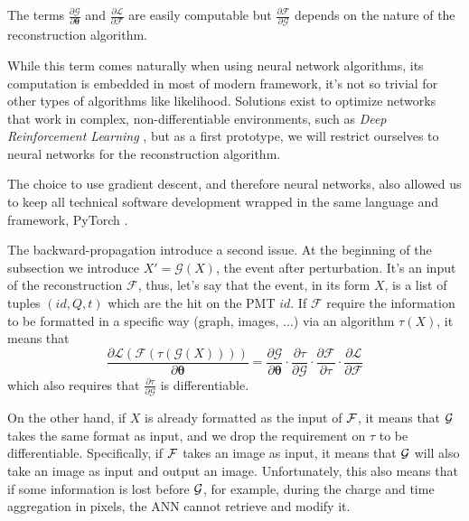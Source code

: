 \documentclass[../main.tex]{subfiles}
\begin{document}
The terms $\frac{\partial \mathcal{G}}{\partial \bm{\theta}}$ and $\frac{\partial \mathcal{L}}{\partial \mathcal{F}}$ are easily computable but $\frac{\partial \mathcal{F}}{\partial \mathcal{G}}$ depends on the nature of the reconstruction algorithm.


While this term comes naturally when using neural network algorithms, its computation is embedded in most of modern framework, it's not so trivial for other types of algorithms like likelihood. Solutions exist to optimize networks that work in complex, non-differentiable environments, such as \textit{Deep Reinforcement Learning} \cite{kiran_deep_2021, vinyals_grandmaster_2019}, but as a first prototype, we will restrict ourselves to neural networks for the reconstruction algorithm.

The choice to use gradient descent, and therefore neural networks, also allowed us to keep all technical software development wrapped in the same language and framework, PyTorch \cite{ansel_pytorch_2024}.

The backward-propagation introduce a second issue. At the beginning of the subsection we introduce $X' = \mathcal{G}(X)$, the event after perturbation. It's an input of the reconstruction $\mathcal{F}$, thus, let's say that the event, in its form $X$, is a list of tuples $(id, Q, t)$ which are the hit on the PMT $id$. If $\mathcal{F}$ require the information to be formatted in a specific way (graph, images, ...) via an algorithm $\tau(X)$, it means that
\begin{equation}
  \frac{\partial \mathcal{L}(\mathcal{F}(\tau(\mathcal{G}(X))))}{\partial \bm{\theta}} = \frac{\partial \mathcal{G}}{\partial \bm{\theta}} \cdot \frac{\partial \tau}{\partial \mathcal{G}} \cdot \frac{\partial \mathcal{F}}{\partial \tau} \cdot \frac{\partial \mathcal{L}}{\partial \mathcal{F}}
\end{equation}
which also requires that $\frac{\partial \tau}{\partial \mathcal{G}}$ is differentiable.

On the other hand, if $X$ is already formatted as the input of ${\cal F}$, it means that ${\cal G}$ takes the same format as input, and we drop the requirement on $\tau$ to be differentiable. Specifically, if ${\cal F}$ takes an image as input, it means that ${\cal G}$ will also take an image as input and output an image. Unfortunately, this also means that if some information is lost before ${\cal G}$, for example, during the charge and time aggregation in pixels, the ANN cannot retrieve and modify it.
\end{document}
